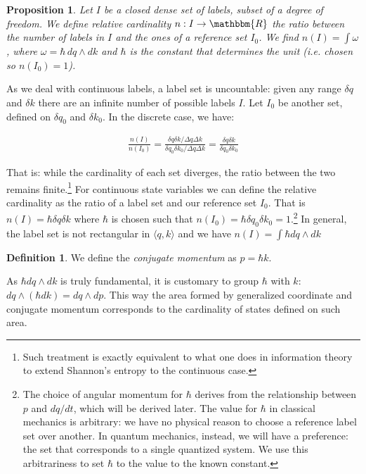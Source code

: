 \documentclass[aps,pra,10pt,twocolumn,floatfix,nofootinbib]{revtex4-1}
\newtheorem{prop}[thm]{Proposition}
\theoremstyle{definition}
\newtheorem{defn}[thm]{Definition}
\begin{document}
\begin{prop}\label{relativeCardinality}
Let $I$ be a closed dense set of labels, subset of a degree of freedom. We define \emph{relative cardinality} $n: I \rightarrow \mathbbm{R}$ the ratio between the number of labels in $I$ and the ones of a reference set $I_0$. We find $n(I)=\int \omega$, where $\omega = \hbar \, dq \wedge dk$ and $\hbar$ is the constant that determines the unit (i.e. chosen so $n(I_0)=1$).
\end{prop}

As we deal with continuous labels, a label set is uncountable: given any range $\delta q$ and $\delta k$ there are an infinite number of possible labels $I$. Let $I_0$ be another set, defined on $\delta q_0$ and $\delta k_0$. In the discrete case, we have:

\begin{align*}
\frac{n(I)}{n(I_0)} = \frac{\delta q \delta k / \Delta q \Delta k}{\delta q_0 \delta k_0 / \Delta q \Delta k} = \frac{\delta q \delta k}{\delta q_0 \delta k_0}
\end{align*}

That is: while the cardinality of each set diverges, the ratio between the two remains finite.\footnote{Such treatment is exactly equivalent to what one does in information theory to extend Shannon's entropy to the continuous case.} For continuous state variables we can define the relative cardinality as the ratio of a label set and our reference set $I_0$. That is $n(I)=\hbar \delta q \delta k$ where $\hbar$ is chosen such that $n(I_0)=\hbar \delta q_0 \delta k_0=1$.\footnote{The choice of angular momentum for $\hbar$ derives from the relationship between $p$ and $dq/dt$, which will be derived later. The value for $\hbar$ in classical mechanics is arbitrary: we have no physical reason to choose a reference label set over another. In quantum mechanics, instead, we will have a preference: the set that corresponds to a single quantized system. We use this arbitrariness to set $\hbar$ to the value to the known constant.} In general, the label set is not rectangular in $\langle q,k \rangle$ and we have $n(I)=\int \hbar dq \wedge dk$

\begin{defn}\label{conjugateMomentum}
We define the \emph{conjugate momentum} as $p=\hbar k$.
\end{defn}

As $\hbar dq \wedge dk$ is truly fundamental, it is customary to group $\hbar$ with $k$: $dq \wedge (\hbar dk) = dq \wedge dp$. This way the area formed by generalized coordinate and conjugate momentum corresponds to the cardinality of states defined on such area.
\end{document}
